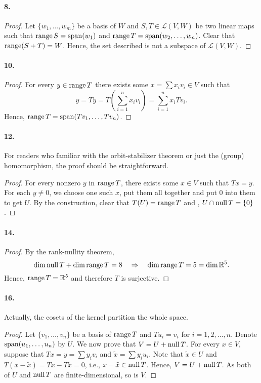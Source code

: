   \paragraph{8.}
  \begin{proof}
    Let $\{w_1,\dots,w_m\}$ be a basis of $W$ and $S,T\in\mathcal{L}(V,W)$ be 
    two linear maps such that $\operatorname{range} S=\operatorname{span}(w_1)$ and $\operatorname{range} T=\operatorname{span}(w_2,\dots,
    w_n)$. Clear that $\operatorname{range}(S+T)=W$. Hence, the set described is not a 
    subspace of $\mathcal{L}(V,W)$.
  \end{proof}

  \paragraph{10.}
  \begin{proof}
    For every $y\in\operatorname{range} T$ there exists some $x=\sum x_iv_i\in V$ such that 
    \[
      y=Ty = T\left(\sum_{i=1}^n x_iv_i\right) = \sum_{i=1}^n x_iTv_i.
    \]
    Hence, $\operatorname{range} T=\operatorname{span}(Tv_1,\dots,Tv_n)$.
  \end{proof}

  \paragraph{12.}
    For readers who familiar with the orbit-stabilizer theorem or just the 
    (group) homomorphism, the proof should be straightforward.
  \begin{proof}
    For every nonzero $y$ in $\operatorname{range} T$, there exists some $x\in V$ such that 
    $Tx=y$. For each $y\ne 0$, we choose one such $x$, put them all together and 
    put $0$ into them to get $U$. By the construction, clear that $T(U) = 
    \operatorname{range} T$ and , $U\cap\operatorname{null} T=\{0\}$.
  \end{proof}

  \paragraph{14.}
  \begin{proof}
   By the rank-nullity theorem, 
   \[
     \dim\operatorname{null} T + \dim\operatorname{range} T = 8 \quad\Rightarrow\quad
     \dim\operatorname{range} T = 5 = \dim\mathbb{R}^5.
   \]
   Hence, $\operatorname{range} T = \mathbb{R}^5$ and therefore $T$ is surjective.
  \end{proof}

  \paragraph{16.}
    Actually, the cosets of the kernel partition the whole space.
  \begin{proof}
    Let $\{v_1,\dots,v_n\}$ be a basis of $\operatorname{range} T$ and $Tu_i=v_i$ for $i=1,2,
    \dots,n$. Denote $\operatorname{span}(u_1,\dots,u_n)$ by $U$. We now prove that $V=U+\operatorname{null}
    T$. For every $x\in V$, suppose that $Tx=y=\sum y_iv_i$ and $\tilde{x}=\sum
    y_iu_i$. Note that $\tilde{x}\in U$ and $T(x-\tilde{x})=Tx-T\tilde{x}=0$, 
    i.e., $x-\tilde{x}\in\operatorname{null} T$. Hence, $V=U+\operatorname{null} T$. As both of $U$ and $\operatorname{null}
    T$ are finite-dimensional, so is $V$.
  \end{proof}

